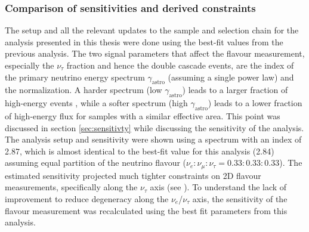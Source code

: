 \subsubsection{Comparison of sensitivities and derived constraints}
\label{sec:sens_bf}
The setup and all the relevant updates to the sample and selection chain for the analysis presented in this thesis were done using the best-fit values from the previous analysis. The two signal parameters that affect the flavour measurement, especially the $\nu_{\tau}$ fraction and hence the double cascade events, are the index of the primary neutrino energy spectrum $\gamma_{\mathrm{astro}}$ (assuming a single power law) and the normalization. A harder spectrum (low $\gamma_{\mathrm{astro}}$) leads to a larger fraction of  high-energy events , while a softer spectrum (high $\gamma_{\mathrm{astro}}$) leads to a lower fraction of high-energy flux for samples with a similar effective area. This point was discussed in section \ref{sec:sensitivty} while discussing the sensitivity of the analysis. The analysis setup and sensitivity were shown using a spectrum with an index of 2.87, which is almost identical to the best-fit value for this analysis (2.84) assuming equal partition of the neutrino flavour ($\nu_e : \nu_{\mu} : \nu_{\tau} = 0.33 : 0.33 : 0.33$). The estimated sensitivity projected much tighter constraints on 2D flavour measurements, specifically along the $\nu_{\tau}$ axis (see ). To understand the lack of improvement to reduce degeneracy along the $\nu_{e}$/$\nu_{\tau}$ axis, the sensitivity of the flavour measurement was recalculated using the best fit parameters from this analysis.


